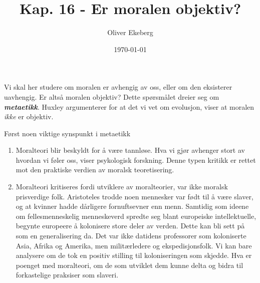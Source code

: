 \documentclass[11pt, a4paper]{article}
\title{Kap. 16 - Er moralen objektiv?}
\author{Oliver Ekeberg}
\date{\today}
\begin{document}
\maketitle

\tableofcontents

\begin{flushleft}
    Vi skal her studere om moralen er avhengig av oss, eller om den eksisterer uavhengig. Er altså moralen objektiv? Dette spørsmålet dreier seg om \textbf{\textit{metaetikk}}. Huxley argumenterer for at det vi vet om evolusjon, viser at moralen \textit{ikke} er objektiv.\newline

    Først noen viktige synspunkt i metaetikk
    \begin{enumerate}
        \item Moralteori blir beskyldt for å være tannløse. Hva vi gjør avhenger stort av hvordan vi føler oss, viser psykologisk forskning. Denne typen kritikk er rettet mot den praktiske verdien av moralsk teoretisering.
        \item Moralteori kritiseres fordi utviklere av moralteorier, var ikke moralsk prisverdige folk. Aristoteles trodde noen mennesker var født til å være slaver, og at kvinner hadde dårligere fornuftsevner enn menn. Samtidig som ideene om fellesmenneskelig menneskeverd spredte seg blant europeiske intellektuelle, begynte europeere å kolonisere store deler av verden. Dette kan bli sett på som en generalisering da. Det var ikke datidens professorer som koloniserte Asia, Afrika og Amerika, men militærledere og ekspedisjonsfolk. Vi kan bare analysere om de tok en positiv stilling til koloniseringen som skjedde. Hva er poenget med moralteori, om de som utviklet dem kunne delta og bidra til forkastelige praksiser som slaveri.
    \end{enumerate}
\end{flushleft}
\end{document}
